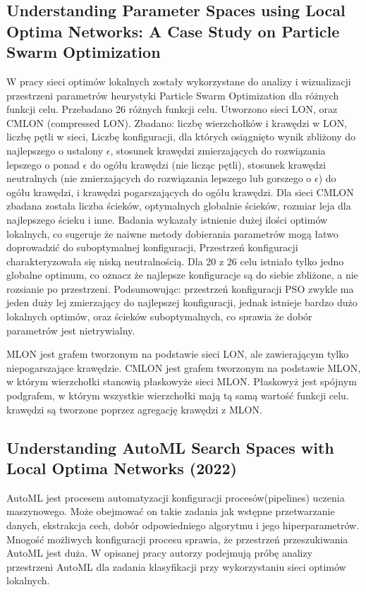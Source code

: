 \subsection*{Understanding Parameter Spaces using Local Optima Networks: A Case Study on Particle Swarm Optimization\cite{DBLP:conf/gecco/CleghornO21}}
W pracy sieci optimów lokalnych zostały wykorzystane do analizy i wizualizacji przestrzeni parametrów heurystyki Particle Swarm Optimization
dla różnych funkcji celu. Przebadano 26 różnych funkcji celu.
Utworzono sieci LON, oraz CMLON (compressed LON).
Zbadano: liczbę wierzchołków i krawędzi w LON, liczbę pętli w sieci, Liczbę konfiguracji, dla których osiągnięto wynik zbliżony do najlepszego o ustalony $\epsilon$,
stosunek krawędzi zmierzających do rozwiązania lepszego o ponad $\epsilon$ do ogółu krawędzi (nie licząc pętli),
stosunek krawędzi neutralnych (nie zmierzających do rozwiązania lepszego lub gorszego o $\epsilon$) do ogółu krawędzi,
i krawędzi pogarszających do ogółu krawędzi.
Dla sieci CMLON zbadana została
liczba ścieków, optymalnych globalnie ścieków, rozmiar leja dla najlepszego ścieku i inne.
Badania wykazały istnienie dużej ilości optimów lokalnych, co sugeruje że naiwne metody dobierania parametrów mogą łatwo doprowadzić do suboptymalnej konfiguracji,
Przestrzeń konfiguracji charakteryzowała się niską neutralnością.
Dla 20 z 26 celu istniało tylko jedno globalne optimum, co oznacz że najlepsze konfiguracje są do siebie zbliżone, a nie rozsianie po przestrzeni.
Podsumowując: przestrzeń konfiguracji PSO zwykle ma jeden duży lej zmierzający do najlepszej konfiguracji, jednak istnieje bardzo dużo lokalnych optimów,
oraz ścieków suboptymalnych, co sprawia że dobór parametrów jest nietrywialny.

MLON jest grafem tworzonym na podstawie sieci LON, ale zawierającym tylko niepogarszające krawędzie.
CMLON jest grafem tworzonym na podstawie MLON, w którym wierzchołki stanowią płaskowyże sieci MLON.
Płaskowyż jest spójnym podgrafem, w którym wszystkie wierzchołki mają tą samą wartość funkcji celu.
krawędzi są tworzone poprzez agregację krawędzi z MLON.

\subsection*{Understanding AutoML Search Spaces with Local Optima Networks (2022) \cite{DBLP:conf/gecco/TeixeiraP22}}
AutoML jest procesem automatyzacji konfiguracji procesów(pipelines) uczenia maszynowego.
Może obejmować on takie zadania jak wstępne przetwarzanie danych, ekstrakcja cech, dobór odpowiedniego algorytmu i jego hiperparametrów.
Mnogość możliwych konfiguracji procesu sprawia, że przestrzeń przeszukiwania AutoML jest duża.
W opisanej pracy autorzy podejmują próbę analizy przestrzeni AutoML dla zadania klasyfikacji przy wykorzystaniu sieci optimów lokalnych.

